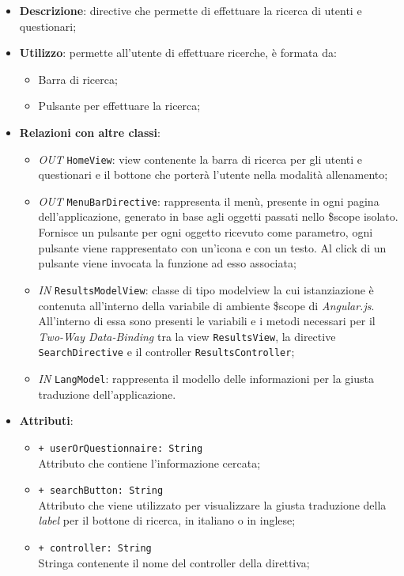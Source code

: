 \begin{itemize}
	\item \textbf{Descrizione}: directive che permette di effettuare la ricerca di utenti e questionari;
	\item \textbf{Utilizzo}: permette all'utente di effettuare ricerche, è formata da:
	\begin{itemize}
		\item Barra di ricerca;
		\item Pulsante per effettuare la ricerca;
	\end{itemize}
	\item \textbf{Relazioni con altre classi}:
	\begin{itemize}
			\item \textit{OUT} \texttt{HomeView}: view contenente la barra di ricerca per gli utenti e questionari e il bottone che porterà l'utente nella modalità allenamento;
		\item \textit{OUT} \texttt{MenuBarDirective}: rappresenta il menù, presente in ogni pagina dell'applicazione, generato in base agli oggetti passati nello \$scope isolato. Fornisce un pulsante per ogni oggetto ricevuto come parametro, ogni pulsante viene rappresentato con un’icona e con un testo. Al click di un pulsante viene invocata la funzione ad esso associata;
		\item \textit{IN} \texttt{ResultsModelView}: classe di tipo modelview la cui istanziazione è contenuta all'interno della variabile di ambiente \$scope di \textit{Angular.js}. All'interno di essa sono presenti le variabili e i metodi necessari per il \textit{Two-Way Data-Binding} tra la view \texttt{ResultsView}, la directive \texttt{SearchDirective} e il controller \texttt{ResultsController};
		\item \textit{IN} \texttt{LangModel}: rappresenta il modello delle informazioni per la giusta traduzione dell'applicazione.
	\end{itemize}
	\item \textbf{Attributi}:
	\begin{itemize}
		\item \texttt{+ userOrQuestionnaire: String} \\ Attributo che contiene l'informazione cercata;
		\item \texttt{+ searchButton: String} \\ Attributo che viene utilizzato per visualizzare la giusta traduzione della \textit{label} per il bottone di ricerca, in italiano o in inglese;
		\item \texttt{+ controller: String} \\ Stringa contenente il nome del controller della direttiva;

\end{itemize}
\end{itemize}
